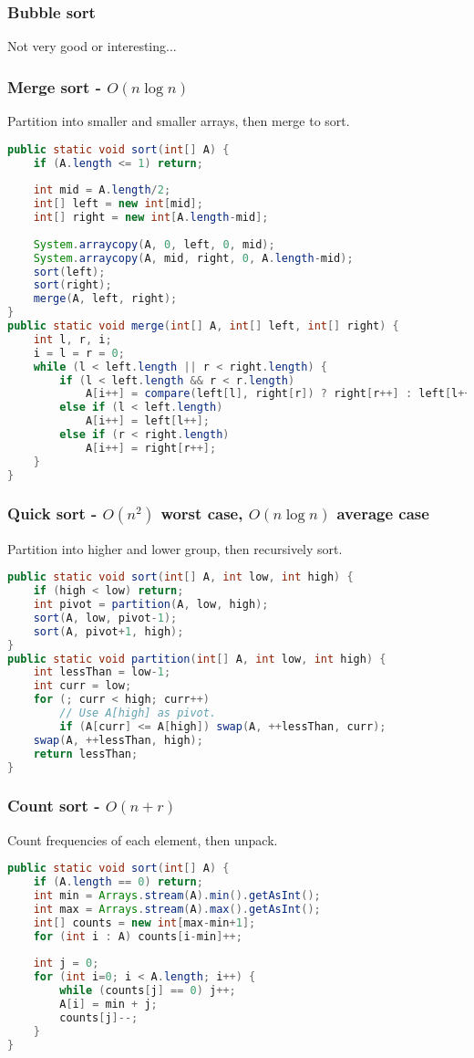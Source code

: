 \documentclass[10pt]{article}
\begin{document}
\subsubsection{Bubble sort}
Not very good or interesting...

\subsubsection{Merge sort - $O(n\log n)$}
Partition into smaller and smaller arrays, then merge to sort.
\begin{lstlisting}[language=java]
public static void sort(int[] A) {
    if (A.length <= 1) return;
    
    int mid = A.length/2;
    int[] left = new int[mid];
    int[] right = new int[A.length-mid];
    
    System.arraycopy(A, 0, left, 0, mid);
    System.arraycopy(A, mid, right, 0, A.length-mid);
    sort(left);
    sort(right);
    merge(A, left, right);
}
public static void merge(int[] A, int[] left, int[] right) {
    int l, r, i;
    i = l = r = 0;
    while (l < left.length || r < right.length) {
        if (l < left.length && r < r.length)
            A[i++] = compare(left[l], right[r]) ? right[r++] : left[l++];
        else if (l < left.length)
            A[i++] = left[l++];
        else if (r < right.length)
            A[i++] = right[r++];
    }    
}
\end{lstlisting}

\subsubsection{Quick sort - $O(n^2)$ worst case, $O(n\log n)$ average case}
Partition into higher and lower group, then recursively sort.
\begin{lstlisting}[language=java]
public static void sort(int[] A, int low, int high) {
    if (high < low) return;
    int pivot = partition(A, low, high);
    sort(A, low, pivot-1);
    sort(A, pivot+1, high);
}
public static void partition(int[] A, int low, int high) {
    int lessThan = low-1;
    int curr = low;
    for (; curr < high; curr++)
        // Use A[high] as pivot.
        if (A[curr] <= A[high]) swap(A, ++lessThan, curr);
    swap(A, ++lessThan, high);
    return lessThan;
}
\end{lstlisting}

\subsubsection{Count sort - $O(n+r)$}
Count frequencies of each element, then unpack.
\begin{lstlisting}[language=java]
public static void sort(int[] A) {
    if (A.length == 0) return;
    int min = Arrays.stream(A).min().getAsInt();
    int max = Arrays.stream(A).max().getAsInt();
    int[] counts = new int[max-min+1];
    for (int i : A) counts[i-min]++;
    
    int j = 0;
    for (int i=0; i < A.length; i++) {
        while (counts[j] == 0) j++;
        A[i] = min + j;
        counts[j]--;
    }
}
\end{lstlisting}
\end{document}
